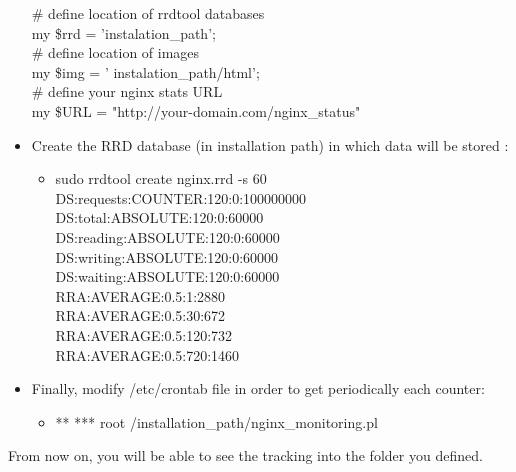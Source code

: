 \begin{itemize}
\# define location of rrdtool databases \\
my \$rrd = 'instalation\_path'; \\
\# define location of images \\
my \$img = ' instalation\_path/html'; \\
\# define your nginx stats URL \\
my \$URL = "http://your-domain.com/nginx\_status" \\
\item Create the RRD database (in installation path) in which data will be stored :
\begin{itemize}
\item sudo rrdtool create nginx.rrd -s 60 \\
DS:requests:COUNTER:120:0:100000000 \\
DS:total:ABSOLUTE:120:0:60000 \\
DS:reading:ABSOLUTE:120:0:60000 \\
DS:writing:ABSOLUTE:120:0:60000 \\
DS:waiting:ABSOLUTE:120:0:60000 \\
RRA:AVERAGE:0.5:1:2880 \\
RRA:AVERAGE:0.5:30:672 \\
RRA:AVERAGE:0.5:120:732 \\
RRA:AVERAGE:0.5:720:1460 \\
\end{itemize}
\item Finally, modify /etc/crontab file in order to get periodically each counter:
\begin{itemize}
\item ** *** root  /installation\_path/nginx\_monitoring.pl
\end{itemize}
\end{itemize}
From now on, you will be able to see the tracking into the folder you defined.